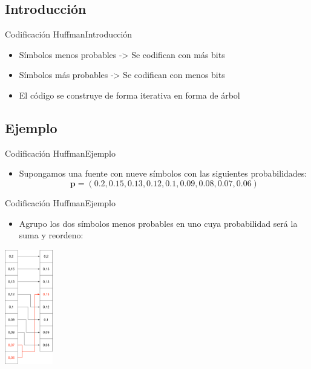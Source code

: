 \documentclass[10pt,compress]{beamer} %
\begin{document}
\subsection{Introducción}

\begin{frame}{Codificación Huffman}{Introducción}
  \begin{itemize}
    \item Símbolos menos probables -> Se codifican con más bits
    \item Símbolos más probables -> Se codifican con menos bits
    \item El código se construye de forma iterativa en forma de árbol
  \end{itemize}
\end{frame}

\subsection{Ejemplo}
\begin{frame}{Codificación Huffman}{Ejemplo}
  \begin{itemize}
    \item Supongamos una fuente con nueve símbolos con las siguientes probabilidades:
    \begin{displaymath}
      \mathbf{p} = (0.2, 0.15, 0.13, 0.12, 0.1, 0.09, 0.08, 0.07, 0.06)
    \end{displaymath}
  \end{itemize}
\end{frame}

\begin{frame}{Codificación Huffman}{Ejemplo}
  \begin{itemize}
    \item Agrupo los dos símbolos menos probables en uno cuya probabilidad será la suma y reordeno:
  \end{itemize}
  \centering \includegraphics[height=5cm]{./Figuras/Huffman1.pdf}
\end{frame}
\end{document}
